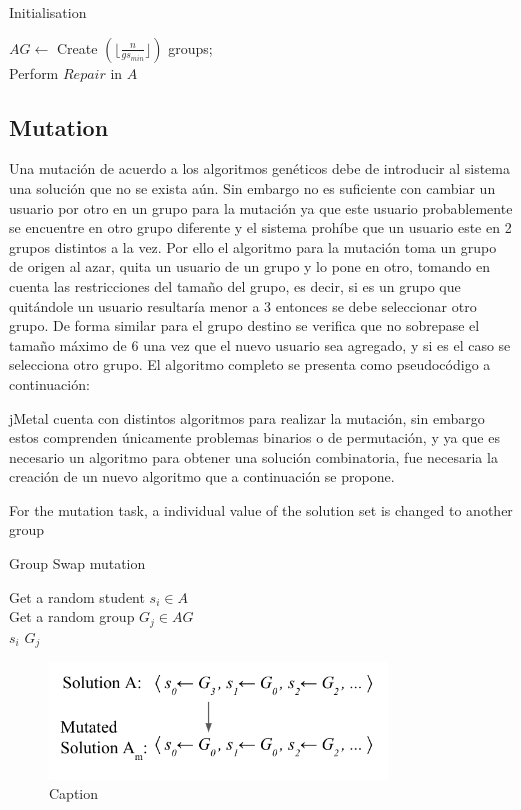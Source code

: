 \begin{algorithm}[H]
\caption{Initialisation}
\label{alg:initialisation}
\SetAlgoLined 
$AG \leftarrow$ Create $(\lfloor\frac{n}{gs_{min}}\rfloor)$ groups;\\
Perform $Repair$ in $A$
\end{algorithm}

\subsection{Mutation}

Una mutación de acuerdo a los algoritmos genéticos debe de introducir al sistema una solución que no se exista aún. Sin embargo no es suficiente con cambiar un usuario por otro en un grupo para la mutación ya que este usuario probablemente se encuentre en otro grupo diferente y el sistema prohíbe que un usuario este en 2 grupos distintos a la vez. Por ello el algoritmo para la mutación toma un grupo de origen al azar, quita un usuario de un grupo y lo pone en otro, tomando en cuenta las restricciones del tamaño del grupo, es decir, si es un grupo que quitándole un usuario resultaría menor a 3 entonces se debe seleccionar otro grupo. De forma similar para el grupo destino se verifica que no sobrepase el tamaño máximo de 6 una vez que el nuevo usuario sea agregado, y si es el caso se selecciona otro grupo. El algoritmo completo se presenta como pseudocódigo a continuación:

jMetal cuenta con distintos algoritmos para realizar la mutación, sin embargo estos comprenden únicamente problemas binarios o de permutación, y ya que es necesario un algoritmo para obtener una solución combinatoria, fue necesaria la creación de un nuevo algoritmo que a continuación se propone.

For the mutation task, a individual value of the solution set is changed to another group

\begin{algorithm}[H]
    \caption{Group Swap mutation}
    \label{alg:mutation}
    \SetAlgoLined 
    Get a random student $s_i \in A$\;\\
    Get a random group $G_j \in AG$\;\\
    $s_i$ \gets $G_j$ 
\end{algorithm}

\begin{figure}
    \centering
    \includegraphics[width=0.8\textwidth]{images/mutation_g.png}
    \caption{Caption}
    \label{fig:my_label}
\end{figure}

